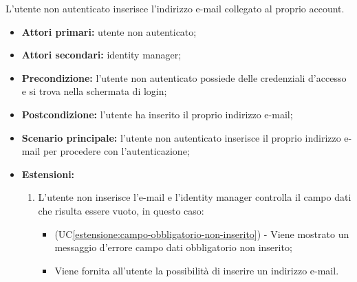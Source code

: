 L'utente non autenticato inserisce l'indirizzo e-mail collegato al proprio account.
\begin{itemize}
	\item \textbf{Attori primari:} utente non autenticato;
	\item \textbf{Attori secondari:} identity manager;
	\item \textbf{Precondizione:} l'utente non autenticato possiede delle credenziali d'accesso e si trova nella schermata di login;
	\item \textbf{Postcondizione:}  l'utente ha inserito il proprio indirizzo e-mail;
	\item \textbf{Scenario principale:} l'utente non autenticato inserisce il proprio indirizzo e-mail per procedere con l'autenticazione;
	\item \textbf{Estensioni:}
	\begin{enumerate}[label=\lett]
		\item L'utente non inserisce l'e-mail e l'identity manager controlla il campo dati che risulta essere vuoto, in questo caso:
		\begin{itemize}
			\item (UC\ref{estensione:campo-obbligatorio-non-inserito}) - Viene mostrato un messaggio d'errore campo dati obbligatorio non inserito;
			\item Viene fornita all'utente la possibilità di inserire un indirizzo e-mail.
		\end{itemize}
	\end{enumerate}
\end{itemize}

\label{autenticazione-venditore.modulo.password}

